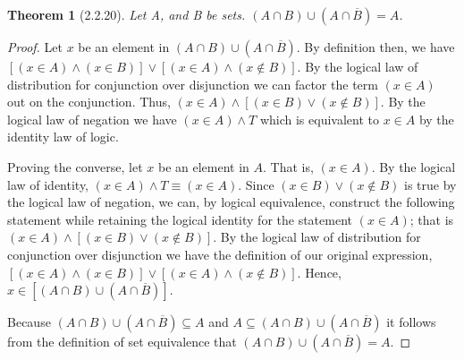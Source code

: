 \documentclass[a4paper, 12pt]{article}
\theoremstyle{plain}
\newtheorem*{theorem*}{Theorem}
\begin{document}
	
	\begin{theorem*}[2.2.20]
		Let A, and B be sets. $(A \cap B) \cup (A \cap \overline{B}) = A$.
	\end{theorem*}
	
	\begin{proof}
		Let $x$ be an element in $(A \cap B) \cup (A \cap \overline{B})$. By definition then, we 
		have $[(x \in A) \land (x \in B)] \lor [(x \in A) \land (x \notin B)]$. By the logical 
		law of distribution for conjunction over disjunction we can factor the term $(x \in A)$ 
		out on the conjunction. Thus, $(x \in A) \land [(x \in B) \lor (x \notin B)]$. By the 
		logical law of negation we have $(x \in A) \land T$ which is equivalent to $x \in A$ by 
		the identity law of logic.
		
		Proving the converse, let $x$ be an element in $A$. That is, $(x \in A)$. By the logical 
		law of identity, $(x \in A) \land T \equiv (x \in A)$. Since $(x \in B) \lor (x \notin B)$ 
		is true by the logical law of negation, we can, by logical equivalence, construct the 
		following statement while retaining the logical identity for the statement $(x \in A)$; that 
		is $(x \in A) \land [(x \in B) \lor (x \notin B)]$. By the logical law of distribution for 
		conjunction over disjunction we have the definition of our original expression, 
		$[(x \in A) \land (x \in B)] \lor [(x \in A) \land (x \notin B)]$. Hence, 
		$x \in [(A \cap B) \cup (A \cap \overline{B})]$.
		
		Because $(A \cap B) \cup (A \cap \overline{B}) \subseteq A$ and 
		$A \subseteq  (A \cap B) \cup (A \cap \overline{B})$ it follows from the definition of set 
		equivalence that $(A \cap B) \cup (A \cap \overline{B}) = A$.
	\end{proof}
\end{document}
